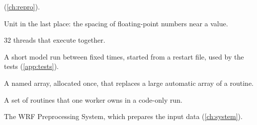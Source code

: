 \begin{description}
    (\cref{ch:repro}).
  \item[ulp] Unit in the last place: the spacing of floating-point numbers near a value.
  \item[Warp] 32 threads that execute together.
  \item[Window] A short model run between fixed times, started from a restart file, used by the tests
    (\cref{app:tests}).
  \item[Work array] A named array, allocated once, that replaces a large automatic array of a routine.
  \item[Work package] A set of routines that one worker owns in a code-only run.
  \item[WPS] The WRF Preprocessing System, which prepares the input data (\cref{ch:system}).
\end{description}
